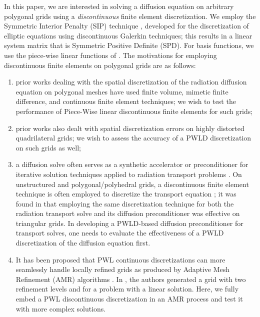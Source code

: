\documentclass[preprint,10pt]{elsarticle}
\begin{document}
In this paper, we are interested in solving a diffusion equation on arbitrary polygonal
grids using a {\em discontinuous} finite element discretization. We employ the
Symmetric Interior Penalty (SIP) technique \cite{Arnold1982,DouglasN.Arnold2002,Kanschat2007,Riviere2008}, 
developed for the discretization of elliptic equations using discontinuous Galerkin techniques;
this results in a linear system matrix that is Symmetric Positive Definite (SPD). For basis functions,
we use the piece-wise linear functions of \cite{BaileyAdams2008}.
The motivations for employing discontinuous finite elements on polygonal grids are as follows: 
\begin{enumerate}
\item 
	prior works dealing with the spatial discretization of the radiation diffusion equation on polygonal meshes 
	have used finite volume, mimetic finite difference, and continuous finite element techniques;  
	we wish to test the performance of Piece-Wise linear discontinuous finite elements for such grids;
\item prior works also dealt with spatial discretization errors on highly distorted quadrilateral grids; 
  we wish to assess the accuracy of a PWLD discretization on such grids as well; 
\item a diffusion solve often serves as a synthetic accelerator or preconditioner for 
  iterative solution techniques applied to radiation transport problems
	\cite{AdamsLarsen2002,JamesS.Warsa2004}. On unstructured and polygonal/polyhedral grids,
	a discontinuous finite element technique is often employed to discretize the transport equation 
	\cite{Wareing_McGhee_Morel_Pautz_DGFEM2001,Warsa2008_CDFEM,Ragusa_Wang_NSE_2009,Bailey_MC2011,Ragusa_Wang_JCP_2011};
	it was found in \cite{Ragusa_Wang_NSE_2010} that employing the same discretization technique for both 
	the radiation transport solve and its diffusion preconditioner was effective on triangular grids.
	In developing a PWLD-based diffusion preconditioner for transport solves, one needs to 
	evaluate the effectiveness of a PWLD discretization of the diffusion equation first.  
\item It has been proposed that PWL continuous discretizations can
  more seamlessly handle locally refined grids as produced by Adaptive Mesh Refinement (AMR) algorithms
	\cite{BaileyAdams2008}. In \cite{BaileyAdams2008}, the authors generated a grid with two refinement levels
	and for a problem with a linear solution. Here, we fully embed a PWL discontinuous discretization
	in an AMR process and test it with more complex solutions.
\end{enumerate}
\end{document}
